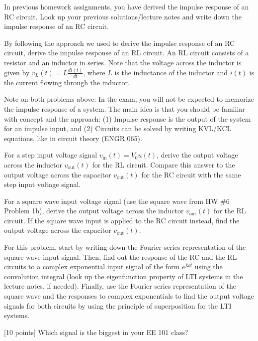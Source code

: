 \documentclass{ee102_pset}
\author{\rule{3cm}{0.4pt}} %
\begin{document}

\problempart [5 points] In previous homework assignments, you have derived the impulse response of an RC circuit. Look up your previous solutions/lecture notes and write down the impulse response of an RC circuit.



\problempart [20 points] By following the approach we used to derive the impulse response of an RC circuit, derive the impulse response of an RL circuit. An RL circuit consists of a resistor and an inductor in series. Note that the voltage across the inductor is given by $v_L(t) = L \frac{di(t)}{dt}$, where $L$ is the inductance of the inductor and $i(t)$ is the current flowing through the inductor.

{\color{blue} Note on both problems above: In the exam, you will not be expected to memorize the impulse response of a system. The main idea is that you should be familiar with concept and the approach: (1) Impulse response is the output of the system for an impulse input, and (2) Circuits can be solved by writing KVL/KCL equations, like in circuit theory (ENGR 065).}

\problempart [20 points] For a step input voltage signal $v_{\text{in}}(t) = V_0 u(t)$, derive the output voltage across the inductor $v_{\text{out}}(t)$ for the RL circuit. Compare this answer to the output voltage across the capacitor $v_{\text{out}}(t)$ for the RC circuit with the same step input voltage signal.

\problempart [25 points] For a square wave input voltage signal (use the square wave from HW \#6 Problem 1b), derive the output voltage across the inductor $v_{\text{out}}(t)$ for the RL circuit. If the square wave input is applied to the RC circuit instead, find the output voltage across the capacitor $v_{\text{out}}(t)$.

For this problem, start by writing down the Fourier series representation of the square wave input signal. Then, find out the response of the RC and the RL circuits to a complex exponential input signal of the form $e^{j \omega t}$ using the convolution integral (look up the eigenfunction property of LTI systems in the lecture notes, if needed). Finally, use the Fourier series representation of the square wave and the responses to complex exponentials to find the output voltage signals for both circuits by using the principle of superposition for the LTI systems.

[10 points] Which signal is the biggest in your EE 101 class? 
\end{document}
